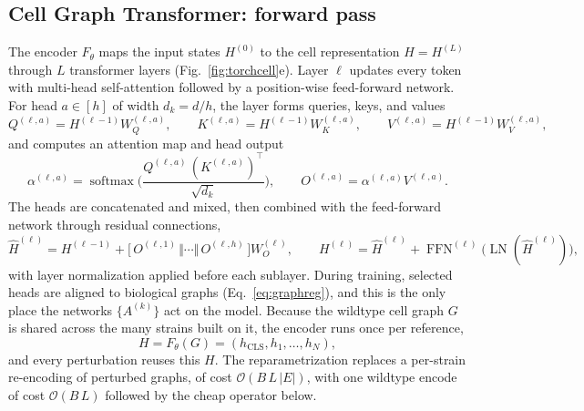 \subsection*{Cell Graph Transformer: forward pass}
The encoder $F_\theta$ maps the input states $H^{(0)}$ to the cell representation
$H=H^{(L)}$ through $L$ transformer layers (Fig.~\ref{fig:torchcell}e). Layer $\ell$ updates
every token with multi-head self-attention followed by a position-wise feed-forward network. For head
$a\in[h]$ of width $d_k=d/h$, the layer forms queries, keys, and values
\begin{equation}
Q^{(\ell,a)}=H^{(\ell-1)}W_Q^{(\ell,a)},\qquad
K^{(\ell,a)}=H^{(\ell-1)}W_K^{(\ell,a)},\qquad
V^{(\ell,a)}=H^{(\ell-1)}W_V^{(\ell,a)},
\label{eq:qkv}
\end{equation}
and computes an attention map and head output
\begin{equation}
\alpha^{(\ell,a)}=\operatorname{softmax}\!\Big(\frac{Q^{(\ell,a)}\,(K^{(\ell,a)})^{\!\top}}{\sqrt{d_k}}\Big),
\qquad
O^{(\ell,a)}=\alpha^{(\ell,a)}V^{(\ell,a)}.
\label{eq:attn}
\end{equation}
The heads are concatenated and mixed, then combined with the feed-forward network through
residual connections,
\begin{equation}
\hat H^{(\ell)}=H^{(\ell-1)}+\big[\,O^{(\ell,1)}\,\Vert\cdots\Vert\,O^{(\ell,h)}\,\big]W_O^{(\ell)},
\qquad
H^{(\ell)}=\hat H^{(\ell)}+\operatorname{FFN}^{(\ell)}\!\big(\operatorname{LN}(\hat H^{(\ell)})\big),
\label{eq:layer}
\end{equation}
with layer normalization applied before each sublayer. During training, selected heads are
aligned to biological graphs (Eq.~\ref{eq:graphreg}), and this is the only place the
networks $\{A^{(k)}\}$ act on the model. Because the wildtype cell graph $G$ is shared
across the many strains built on it, the encoder runs once per reference,
\begin{equation}
H=F_\theta(G)=(h_{\mathrm{CLS}},h_1,\dots,h_N),
\label{eq:encode}
\end{equation}
and every perturbation reuses this $H$. The reparametrization replaces a per-strain
re-encoding of perturbed graphs, of cost $\mathcal{O}(B\,L\,\lvert E\rvert)$, with one
wildtype encode of cost $\mathcal{O}(B\,L)$ followed by the cheap operator below.

